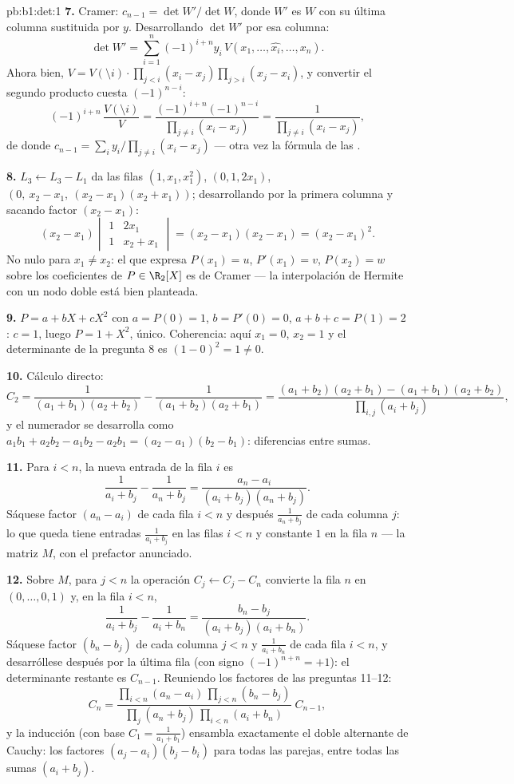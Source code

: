 \begin{solution}{pb:b1:det:1}
\textbf{7.} Cramer: $c_{n-1} = \det W'/\det W$, donde $W'$ es $W$ con
su última columna sustituida por $y$. Desarrollando $\det W'$ por esa
columna:
\[
\det W' = \sum_{i=1}^n (-1)^{i+n} y_i\,V(x_1, \dots, \widehat{x_i},
\dots, x_n) .
\]
Ahora bien, $V = V(\setminus i)\cdot\prod_{j<i}(x_i -
x_j)\prod_{j>i} (x_j - x_i)$, y convertir el segundo producto cuesta
$(-1)^{n-i}$:
\[
(-1)^{i+n}\,\frac{V(\setminus i)}{V}
= \frac{(-1)^{i+n}(-1)^{n-i}}{\prod_{j\neq i}(x_i - x_j)}
= \frac{1}{\prod_{j\neq i}(x_i - x_j)} ,
\]
de donde $c_{n-1} = \sum_i y_i/\prod_{j \neq i}(x_i - x_j)$ --- otra
vez la fórmula de las .

\textbf{8.} $L_3 \leftarrow L_3 - L_1$ da las filas
$(1, x_1, x_1^2)$, $(0, 1, 2x_1)$,
$(0,\ x_2 - x_1,\ (x_2-x_1)(x_2+x_1))$; desarrollando por la primera
columna y sacando factor $(x_2 - x_1)$:
\[
(x_2 - x_1)\begin{vmatrix} 1 & 2x_1\\ 1 & x_2 + x_1
\end{vmatrix} = (x_2 - x_1)(x_2 - x_1) = (x_2 - x_1)^2 .
\]
No nulo para $x_1 \neq x_2$: el  que expresa
$P(x_1) = u$, $P'(x_1) = v$, $P(x_2) = w$ sobre los coeficientes de
$P \in \R_2[X]$ es de Cramer --- la interpolación de Hermite con un
nodo doble está bien planteada.

\textbf{9.} $P = a + bX + cX^2$ con $a = P(0) = 1$,
$b = P'(0) = 0$, $a + b + c = P(1) = 2$: $c = 1$, luego
$P = 1 + X^2$, único. Coherencia: aquí $x_1 = 0$, $x_2 = 1$ y el
determinante de la pregunta 8 es $(1 - 0)^2 = 1 \neq 0$.

\textbf{10.} Cálculo directo:
\[
C_2 = \frac{1}{(a_1+b_1)(a_2+b_2)} - \frac{1}{(a_1+b_2)(a_2+b_1)}
= \frac{(a_1+b_2)(a_2+b_1) - (a_1+b_1)(a_2+b_2)}
{\prod_{i,j}(a_i+b_j)} ,
\]
y el numerador se desarrolla como
$a_1b_1 + a_2b_2 - a_1b_2 - a_2b_1 = (a_2 - a_1)(b_2 - b_1)$:
diferencias entre sumas.

\textbf{11.} Para $i < n$, la nueva entrada de la fila $i$ es
\[
\frac{1}{a_i + b_j} - \frac{1}{a_n + b_j}
= \frac{a_n - a_i}{(a_i + b_j)(a_n + b_j)} .
\]
Sáquese factor $(a_n - a_i)$ de cada fila $i < n$ y después
$\frac1{a_n + b_j}$ de cada columna $j$: lo que queda tiene entradas
$\frac1{a_i + b_j}$ en las filas $i < n$ y constante $1$ en la fila
$n$ --- la matriz $M$, con el prefactor anunciado.

\textbf{12.} Sobre $M$, para $j < n$ la operación
$C_j \leftarrow C_j - C_n$ convierte la fila $n$ en
$(0, \dots, 0, 1)$ y, en la fila $i < n$,
\[
\frac{1}{a_i + b_j} - \frac{1}{a_i + b_n}
= \frac{b_n - b_j}{(a_i + b_j)(a_i + b_n)} .
\]
Sáquese factor $(b_n - b_j)$ de cada columna $j < n$ y
$\frac1{a_i + b_n}$ de cada fila $i < n$, y desarróllese después por
la última fila (con signo $(-1)^{n+n} = +1$): el determinante
restante es $C_{n-1}$. Reuniendo los factores de las preguntas
11--12:
\[
C_n = \frac{\prod_{i<n}(a_n - a_i)\,\prod_{j<n}(b_n - b_j)}
{\prod_{j}(a_n + b_j)\,\prod_{i<n}(a_i + b_n)}\;C_{n-1},
\]
y la inducción (con base $C_1 = \frac1{a_1+b_1}$) ensambla
exactamente el doble alternante de Cauchy: los factores
$(a_j - a_i)(b_j - b_i)$ para todas las parejas, entre todas las
sumas $(a_i + b_j)$.


\end{solution}

